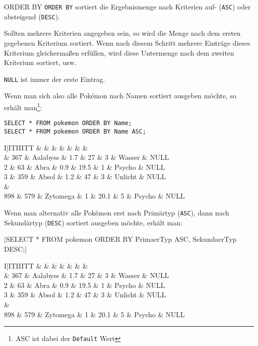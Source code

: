 \begin{sql}{ORDER BY}
    \texttt{ORDER BY} sortiert die Ergebnismenge nach Kriterien auf- (\texttt{ASC}) oder absteigend (\texttt{DESC}).
    
    Sollten mehrere Kriterien angegeben sein, so wird die Menge nach dem ersten gegebenen Kriterium sortiert.
    Wenn nach diesem Schritt mehrere Einträge dieses Kriterium gleichermaßen erfüllen, wird diese Untermenge nach dem zweiten Kriterium sortiert, usw.

    \texttt{NULL} ist immer der erste Eintrag.
    
    Wenn man sich also alle Pokémon nach Namen sortiert ausgeben möchte, so erhält man\footnote{ASC ist dabei der \texttt{Default} Wert}:

    \begin{verbatim}
SELECT * FROM pokemon ORDER BY Name;
SELECT * FROM pokemon ORDER BY Name ASC;
    \end{verbatim}

    \begin{tabular}{I|ITIIITT}
        &  &  &  &  &  &  &  \\ & 367 & Aalabyss & 1.7 & 27 & 3 & Wasser & NULL \\
        2 & 63 & Abra & 0.9 & 19.5 & 1 & Psycho & NULL \\
        3 & 359 & Absol & 1.2 & 47 & 3 & Unlicht & NULL \\       
         &  \\
        898 & 579 & Zytomega & 1 & 20.1 & 5 & Psycho & NULL \\
    \end{tabular}

    Wenn man alternativ alle Pokémon erst nach Primärtyp (\texttt{ASC}), dann nach Sekundärtyp (\texttt{DESC}) sortiert ausgeben möchte, erhält man:

    |SELECT * FROM pokemon ORDER BY PrimaerTyp ASC, SekundaerTyp DESC;|

    \begin{tabular}{I|ITIIITT}
        &  &  &  &  &  &  &  \\ & 367 & Aalabyss & 1.7 & 27 & 3 & Wasser & NULL \\
        2 & 63 & Abra & 0.9 & 19.5 & 1 & Psycho & NULL \\
        3 & 359 & Absol & 1.2 & 47 & 3 & Unlicht & NULL \\       
         &  \\
        898 & 579 & Zytomega & 1 & 20.1 & 5 & Psycho & NULL \\
    \end{tabular}
\end{sql}

